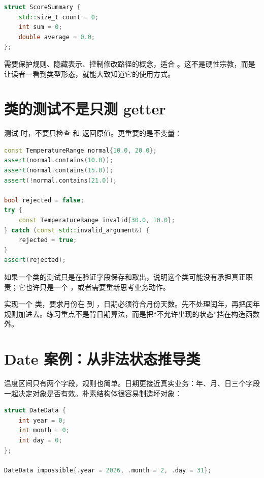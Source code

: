 \begin{lstlisting}[language=C++,caption={简单结果适合 struct}]
struct ScoreSummary {
    std::size_t count = 0;
    int sum = 0;
    double average = 0.0;
};
\end{lstlisting}

需要保护规则、隐藏表示、控制修改路径的概念，适合 。这不是硬性宗教，而是让读者一看到类型形态，就能大致知道它的使用方式。

\section{类的测试不是只测 getter}

测试  时，不要只检查  和  返回原值。更重要的是不变量：

\begin{lstlisting}[language=C++,caption={围绕不变量测试类}]
const TemperatureRange normal{10.0, 20.0};
assert(normal.contains(10.0));
assert(normal.contains(15.0));
assert(!normal.contains(21.0));

bool rejected = false;
try {
    const TemperatureRange invalid{30.0, 10.0};
} catch (const std::invalid_argument&) {
    rejected = true;
}
assert(rejected);
\end{lstlisting}

如果一个类的测试只是在验证字段保存和取出，说明这个类可能没有承担真正职责；它也许只是一个 ，或者需要重新思考业务动作。

\begin{exercisebox}
实现一个  类，要求月份在  到 ，日期必须符合月份天数。先不处理闰年，再把闰年规则加进去。练习重点不是背日期算法，而是把“不允许出现的状态”挡在构造函数外。
\end{exercisebox}

\section{Date 案例：从非法状态推导类}

温度区间只有两个字段，规则也简单。日期更接近真实业务：年、月、日三个字段一起决定对象是否有效。朴素结构体很容易制造坏对象：

\begin{lstlisting}[language=C++,caption={日期坏对象}]
struct DateData {
    int year = 0;
    int month = 0;
    int day = 0;
};

DateData impossible{.year = 2026, .month = 2, .day = 31};
\end{lstlisting}

